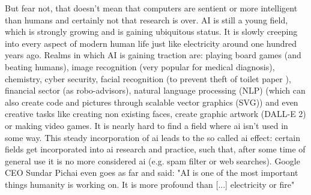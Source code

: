 But fear not, that doesn't mean that computers are sentient or more intelligent than humans\cite{searle1980,searle1999married} and certainly not that research is over. 
AI is still a young field, which is strongly growing and is gaining ubiquitous status. 
It is slowly creeping into every aspect of modern human life just like electricity around one hundred years ago. 
Realms in which AI is gaining traction are: 
%
playing board games (and beating humans)\cite{Silver2017,Feng1999,Campbell2002}, 
image recognition (very popular for medical diagnosis)\cite{Li2020,Deo2015,Topol2019,Fujiyoshi2019}, 
chemistry\cite{Westermayr2019,goh2017chemception,jha2018elemnet}, 
cyber security\cite{Sarker2021},
facial recognition (to prevent theft of toilet paper \cite{Andrews2017}),
financial sector (as robo-advisors)\cite{Littman2021},
natural language processing (NLP)\cite{Koroteev2021,Liu2021gpt,Parviainen2021} 
(which can also create code and pictures through scalable vector graphics (SVG))
and even creative tasks like 
creating non existing faces\cite{Mansourifar2020}, 
create graphic artwork (DALL-E 2)\cite{Marcus2022} or 
making video games\cite{Guzdial2016}.
%
It is nearly hard to find a field where \gls{ai} isn't used in some way. 
This steady incorporation of \gls{ai} leads to the so called \gls{ai} effect\cite{McCorduck1982,ai100}: 
certain fields get incorporated into \gls{ai} research and practice,
such that, after some time of general use it is no more considered \gls{ai} (e.g. spam filter or web searches).
Google CEO Sundar Pichai even goes as far and said: 
"AI is one of the most important things humanity is working on. It is more profound than [...] electricity or fire"\cite{Hassan2020}

%
